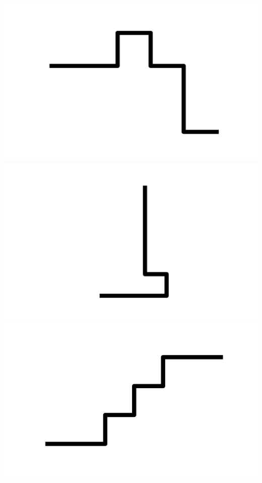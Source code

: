 \documentclass[]{report}
\begin{document}
\includegraphics[scale=.1]{pictures/21/state_cluster_shapes_433.pdf} 
\includegraphics[scale=.1]{pictures/21/state_cluster_shapes_434.pdf} 
\includegraphics[scale=.1]{pictures/21/state_cluster_shapes_435.pdf} 
\end{document}
